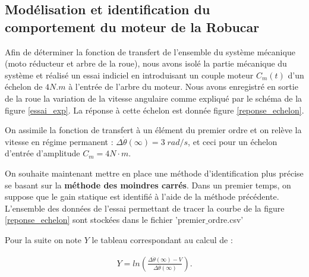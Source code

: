 \subsection{Modélisation et identification du comportement du moteur de la Robucar}

Afin de déterminer la fonction de transfert de l'ensemble du système mécanique (moto réducteur et arbre de la roue), nous avons isolé la partie mécanique du système et réalisé un essai indiciel en introduisant un couple moteur $C_m(t)$ d'un échelon de $4N.m$ à l'entrée de l'arbre du moteur. Nous avons enregistré en sortie de la roue la variation de la vitesse angulaire comme expliqué par le schéma de la figure \ref{essai_exp}. La réponse à cette échelon est donnée figure \ref{reponse_echelon}.

On assimile la fonction de transfert à un élément du premier ordre et on relève la vitesse en régime permanent : $\Delta \dot{\theta}(\infty)=3\;rad/s$, et ceci pour un échelon d'entrée d'amplitude $C_m=4N\cdot m$.



On souhaite maintenant mettre en place une méthode d'identification plus précise se basant sur la \textbf{méthode des moindres carrés}.
Dans un premier temps, on suppose que le gain statique est identifié à l'aide de la méthode précédente.
L'ensemble des données de l'essai permettant de tracer la courbe de la figure \ref{reponse_echelon} sont stockées dans le fichier 'premier$\_$ordre.csv'



Pour la suite on note $Y$ le tableau correspondant au calcul de : 

\begin{align*}
Y=ln\left(\frac{\Delta \dot{\theta}(\infty)-V}{\Delta \dot{\theta}(\infty)}\right).
\end{align*}

